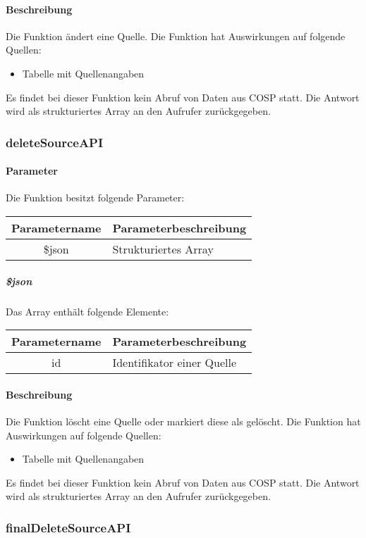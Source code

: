 \paragraph{Beschreibung} Die Funktion ändert eine Quelle. Die Funktion hat Auswirkungen auf folgende Quellen:
\begin{itemize}
	\item Tabelle mit Quellenangaben
\end{itemize}
Es findet bei dieser Funktion kein Abruf von Daten aus {\glqq COSP\grqq} statt. Die Antwort wird als strukturiertes Array an den Aufrufer zurückgegeben.
\subsubsection{deleteSourceAPI}
\paragraph{Parameter} Die Funktion besitzt folgende Parameter:
\begin{table}[H]
	\begin{tabular}{|c|p{11cm}|}
		\hline
		\textbf{Parametername} & \textbf{Parameterbeschreibung} \\ \hline
		\$json & Strukturiertes Array \\ \hline
	\end{tabular}
\end{table}
\subparagraph{\$json}Das Array enthält folgende Elemente:
\begin{table}[H]
	\begin{tabular}{|c|p{11cm}|}
		\hline
		\textbf{Parametername} & \textbf{Parameterbeschreibung} \\ \hline
		id & Identifikator einer Quelle \\ \hline
	\end{tabular}
\end{table}
\paragraph{Beschreibung} Die Funktion löscht eine Quelle oder markiert diese als gelöscht. Die Funktion hat Auswirkungen auf folgende Quellen:
\begin{itemize}
	\item Tabelle mit Quellenangaben
\end{itemize}
Es findet bei dieser Funktion kein Abruf von Daten aus {\glqq COSP\grqq} statt. Die Antwort wird als strukturiertes Array an den Aufrufer zurückgegeben.
\subsubsection{finalDeleteSourceAPI}
